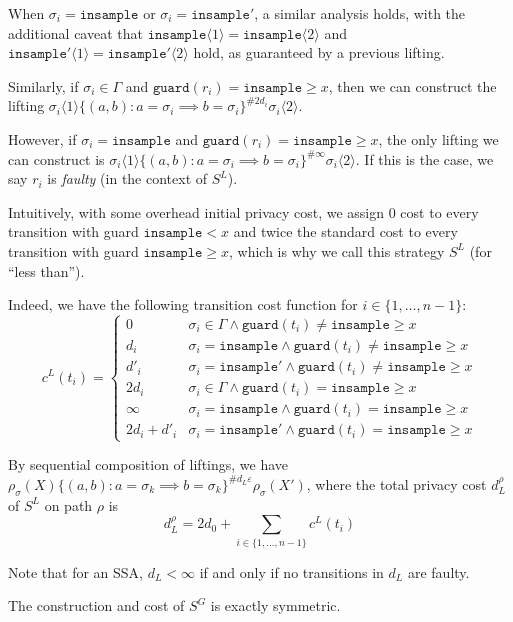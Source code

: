 \documentclass[12pt]{article}
\newcommand{\gguard}[1][x]{\texttt{insample}\geq #1}
\newcommand{\lguard}[1][x]{\texttt{insample} < #1}
\newcommand{\brangle}[1]{\langle #1 \rangle}
\newcommand{\guard}{\texttt{guard}}
\theoremstyle{definition}
\begin{document}
When $\sigma_i = \texttt{insample}$ or $\sigma_i = \texttt{insample}'$, a similar analysis holds, with the additional caveat that $\texttt{insample}\brangle{1} = \texttt{insample}\brangle{2}$ and $\texttt{insample}'\brangle{1} = \texttt{insample}'\brangle{2}$ hold, as guaranteed by a previous lifting. 

Similarly, if $\sigma_i \in \Gamma$ and $\guard(r_i) = \gguard$, then we can construct the lifting $\sigma_i\brangle{1}\{(a, b): a = \sigma_i \implies b = \sigma_i\}^{\#2d_i}\sigma_i\brangle{2}$.

However, if $\sigma_i = \texttt{insample}$ and $\guard(r_i) = \gguard$, the only lifting we can construct is $\sigma_i\brangle{1}\{(a, b): a = \sigma_i \implies b = \sigma_i\}^{\#\infty}\sigma_i\brangle{2}$. If this is the case, we say $r_i$ is \textit{faulty} (in the context of $S^L$).

Intuitively, with some overhead initial privacy cost, we assign 0 cost to every transition with guard $\lguard$ and twice the standard cost to every transition with guard $\gguard$, which is why we call this strategy $S^L$ (for ``less than'').

Indeed, we have the following transition cost function for $i\in\{1, \ldots, n-1\}$:
\[
    c^L(t_i) = \begin{cases}
        0 & \sigma_i \in \Gamma \land \guard(t_i)\neq \gguard\\
        d_i & \sigma_i = \texttt{insample}\land \guard(t_i)\neq \gguard\\
        d'_i & \sigma_i = \texttt{insample}'\land \guard(t_i)\neq \gguard\\
        2d_i & \sigma_i \in \Gamma \land \guard(t_i) =\gguard\\
        \infty & \sigma_i = \texttt{insample} \land \guard(t_i) =\gguard\\
        2d_i +d'_i& \sigma_i = \texttt{insample}' \land \guard(t_i) =\gguard
    \end{cases}    
\] 

By sequential composition of liftings, we have $\rho_\sigma(X)\{(a, b): a = \sigma_k \implies b = \sigma_k\}^{\#d_L\varepsilon}\rho_\sigma(X')$, where the total privacy cost $d_L^\rho$ of $S^L$ on path $\rho$ is \[
	d_L^\rho=2d_0+ \sum_{i\in\{1, \ldots, n-1\}}c^L(t_i)
\]

Note that for an SSA, $d_L < \infty$ if and only if no transitions in $d_L$ are faulty. 

The construction and cost of $S^G$ is exactly symmetric. 
\end{document}
